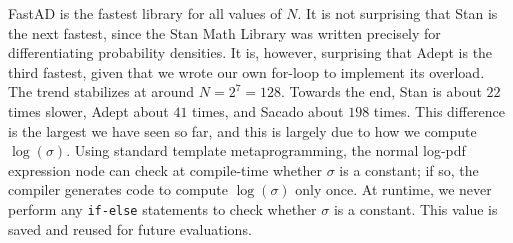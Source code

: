 FastAD is the fastest library for all values of $N$.
It is not surprising that Stan is the next fastest, 
since the Stan Math Library was written precisely for differentiating probability densities.
It is, however, surprising that Adept is the third fastest,
given that we wrote our own for-loop to implement its overload.
The trend stabilizes at around $N=2^{7}=128$.
Towards the end,
Stan is about $ 22$ times slower,
Adept about $ 41$ times,
and Sacado about $ 198$ times.
This difference is the largest we have seen so far,
and this is largely due to how we compute $\log(\sigma)$.
Using standard template metaprogramming, 
the normal log-pdf expression node can check at compile-time whether $\sigma$ is a constant;
if so, the compiler generates code to compute $\log(\sigma)$ only once.
At runtime, we never perform any \verb|if-else| statements
to check whether $\sigma$ is a constant.
This value is saved and reused for future evaluations.
